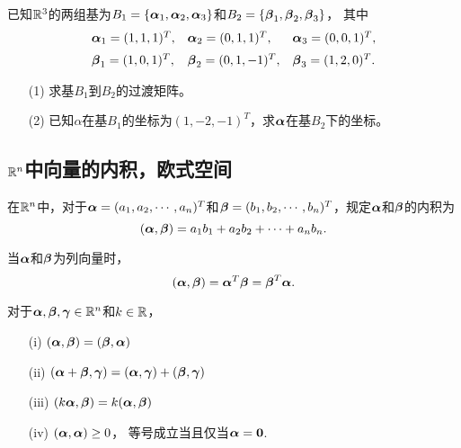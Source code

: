 \begin{frame}\ft{\subsecname}

\begin{li}
  已知$\mathbb R^3$的两组基为$B_1=\{\boldsymbol{\alpha}_1,\boldsymbol{\alpha}_2,\boldsymbol{\alpha}_3\}$和$B_2=\{\boldsymbol{\beta}_1,\boldsymbol{\beta}_2,\boldsymbol{\beta}_3\}$，
  其中
  $$
  \begin{array}{lll}
    \boldsymbol{\alpha}_1=(1,1,1)^T,&\boldsymbol{\alpha}_2=(0,1,1)^T,&\boldsymbol{\alpha}_3=(0,0,1)^T, \\[0.2cm]
    \boldsymbol{\beta}_1=(1,0,1)^T,&\boldsymbol{\beta}_2=(0,1,-1)^T,&\boldsymbol{\beta}_3=(1,2,0)^T.  
  \end{array}
  $$
  \begin{itemize}
  \item[(1)] 求基$B_1$到$B_2$的过渡矩阵。
  \item[(2)] 已知$\alpha$在基$B_1$的坐标为$(1,-2,-1)^T$，求$\boldsymbol{\alpha}$在基$B_2$下的坐标。
  \end{itemize}
  
\end{li}

\end{frame}

\subsection{$\mathbb R^n$中向量的内积，欧式空间}
\begin{frame}\ft{\subsecname}
\begin{dingyi}
  在$\mathbb R^n$中，对于$\boldsymbol{\alpha}=(a_1,a_2,\cdots,a_n)^T$和$\boldsymbol{\beta}=(b_1,b_2,\cdots,b_n)^T$，规定$\boldsymbol{\alpha}$和$\boldsymbol{\beta}$的内积为
  $$
  (\boldsymbol{\alpha},\boldsymbol{\beta})=a_1b_1+a_2b_2+\cdots+a_nb_n.
  $$
\end{dingyi}
当$\boldsymbol{\alpha}$和$\boldsymbol{\beta}$为列向量时，
$$
(\boldsymbol{\alpha},\boldsymbol{\beta})=\boldsymbol{\alpha}^T\boldsymbol{\beta}=\boldsymbol{\beta}^T\boldsymbol{\alpha}.
$$
\end{frame}

\begin{frame}\ft{\subsecname}

\begin{xingzhi}[内积的运算性质]
  对于$\boldsymbol{\alpha},\boldsymbol{\beta},\boldsymbol{\gamma}\in\mathbb R^n$和$k\in\mathbb R$，
  \begin{itemize}
  \item[(i)]   $(\boldsymbol{\alpha},\boldsymbol{\beta})=(\boldsymbol{\beta},\boldsymbol{\alpha})$
  \item[(ii)]  $(\boldsymbol{\alpha}+\boldsymbol{\beta},\boldsymbol{\gamma})=(\boldsymbol{\alpha},\boldsymbol{\gamma})+(\boldsymbol{\beta},\boldsymbol{\gamma})$
  \item[(iii)] $(k\boldsymbol{\alpha},\boldsymbol{\beta})=k(\boldsymbol{\alpha},\boldsymbol{\beta})$
  \item[(iv)]  $(\boldsymbol{\alpha},\boldsymbol{\alpha})\ge0$， 等号成立当且仅当$\boldsymbol{\alpha}=\boldsymbol{0}$.
  \end{itemize}
\end{xingzhi}

\end{frame}

